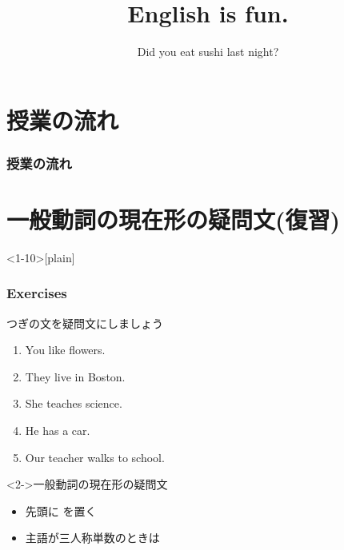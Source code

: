\documentclass[aspectratio=169,xcolor={dvipsnames,table}]{beamer}
\title{English is fun.}
\subtitle{Did you eat sushi last night?}
\author{}
\institute[]{}
\date[]
\newcommand{\myaudio}[1]{\href{#1}{\faVolumeUp}}
\begin{document}
\begin{frame}[plain]
  \titlepage
\end{frame}

\section*{授業の流れ}
\begin{frame}[plain]
  \frametitle{授業の流れ}
  \tableofcontents
\end{frame}

\section{一般動詞の現在形の疑問文(復習)}
 
\begin{frame}<1-10>[plain]\frametitle{Exercises}

つぎの文を疑問文にしましょう

 \begin{enumerate}
  \item<1-> You like flowers.\hspace{59.7pt}
  \item<1-> They live in Boston.\hspace{47.5pt}%
  \item<1-> She teaches science.\hspace{42pt}%
  \item<1-> He has  a car.\hspace{80.5pt}%
  \item<1-> Our teacher walks to school.
 \end{enumerate}

\begin{exampleblock}<2->{一般動詞の現在形の疑問文}
\begin{itemize}[square]\small
 \item<3->   先頭に  を置く\pause
 \item<4->   主語が三人称単数のときは 
\end{itemize}
\end{exampleblock}
\vspace{-10pt}
%
 \mbox{}\hfill\myaudio{./audio/027_past_did_you_01.mp3}

\end{frame}
\end{document}
